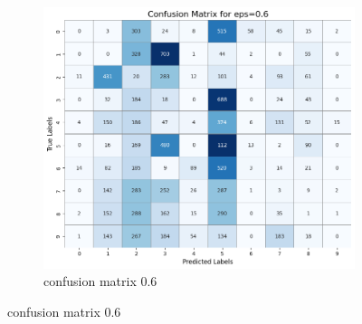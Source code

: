 \documentclass[11pt,onside]{article}
\begin{document}
\begin{figure}[h]
  \centering
  \begin{subfigure}[b]{0.49\textwidth}
    \centering
    \includegraphics[width=\textwidth]{V2_images/target_confusion_matrix_eps_0.6_attack_1.png}
    \caption{confusion matrix 0.6 }
    \label{fig:image1}
  \end{subfigure}
  
\end{figure}
\end{document}

